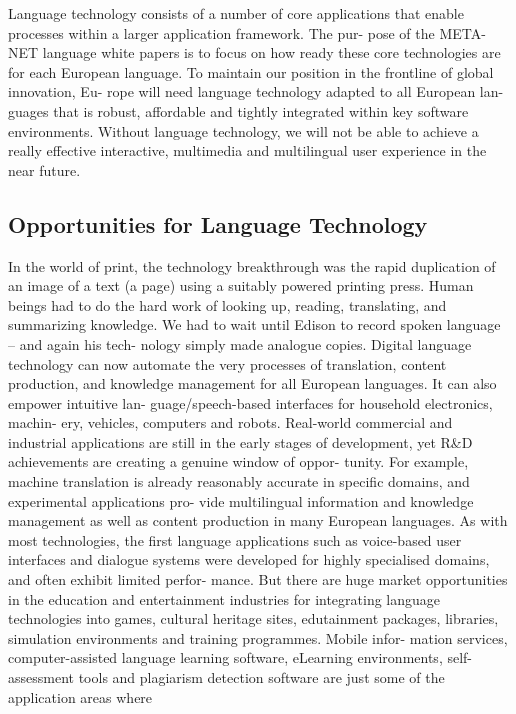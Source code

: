 \documentclass[]{../metanetpaper}
\begin{document}
Language technology consists of a number of core applications that
enable processes within a larger application framework. The pur-
pose of the META-NET language white papers is to focus on how
ready these core technologies are for each European language.
To maintain our position in the frontline of global innovation, Eu-
rope will need language technology adapted to all European lan-
guages that is robust, affordable and tightly integrated within key
software environments. Without language technology, we will not
be able to achieve a really effective interactive, multimedia and
multilingual user experience in the near future.
\subsection{Opportunities for Language Technology}
In the world of print, the technology breakthrough was the rapid
duplication of an image of a text (a page) using a suitably powered
printing press. Human beings had to do the hard work of looking
up, reading, translating, and summarizing knowledge. We had to
wait until Edison to record spoken language – and again his tech-
nology simply made analogue copies.
Digital language technology can now automate the very processes
of translation, content production, and knowledge management for
all European languages. It can also empower intuitive lan-
guage/speech-based interfaces for household electronics, machin-
ery, vehicles, computers and robots. Real-world commercial and
industrial applications are still in the early stages of development,
yet R\&D achievements are creating a genuine window of oppor-
tunity. For example, machine translation is already reasonably
accurate in specific domains, and experimental applications pro-
vide multilingual information and knowledge management as well
as content production in many European languages.
As with most technologies, the first language applications such as
voice-based user interfaces and dialogue systems were developed
for highly specialised domains, and often exhibit limited perfor-
mance. But there are huge market opportunities in the education
and entertainment industries for integrating language technologies
into games, cultural heritage sites, edutainment packages, libraries,
simulation environments and training programmes. Mobile infor-
mation services, computer-assisted language learning software,
eLearning environments, self-assessment tools and plagiarism
detection software are just some of the application areas where
\end{document}
